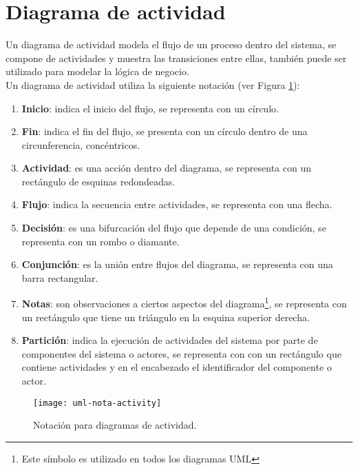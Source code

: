 \section{Diagrama de actividad}\label{sec:uml-act}
Un diagrama de actividad modela el flujo de un proceso dentro del sistema, se compone de actividades y muestra las transiciones entre ellas, también puede ser utilizado para modelar la lógica de negocio\cite{UMLClassroom, SoftwareEngineeringUML}.\\
Un diagrama de actividad utiliza la siguiente notación\cite{UMLClassroom, SoftwareEngineeringUML} (ver Figura \ref{fig:uml-nota-activity}):
\begin{enumerate}
  \item \textbf{Inicio}: indica el inicio del flujo, se representa con un círculo.
  \item \textbf{Fin}: indica el fin del flujo, se presenta con un círculo dentro de una circunferencia, concéntricos.
  \item \textbf{Actividad}: es una acción dentro del diagrama, se representa con un rectángulo de esquinas redondeadas.
  \item \textbf{Flujo}: indica la secuencia entre actividades, se representa con una flecha.
  \item \textbf{Decisión}: es una bifurcación del flujo que depende de una condición, se representa con un rombo o diamante.
  \item \textbf{Conjunción}: es la unión entre flujos del diagrama, se representa con una barra rectangular.
  \item \textbf{Notas}: son observaciones a ciertos aspectos del diagrama\footnote{Este símbolo es utilizado en todos los diagramas UML}, se representa con un rectángulo que tiene un triángulo en la esquina superior derecha.
  \item \textbf{Partición}: indica la ejecución de actividades del sistema por parte de componentes del sistema o actores, se representa con con un rectángulo que contiene actividades y en el encabezado el identificador del componente o actor.
\end{enumerate}

\begin{figure}[h]
  \centering
  \texttt{[image: uml-nota-activity]}
  \caption{Notación para diagramas de actividad\cite{SoftwareEngineeringUML}.}
  \label{fig:uml-nota-activity}
\end{figure}

